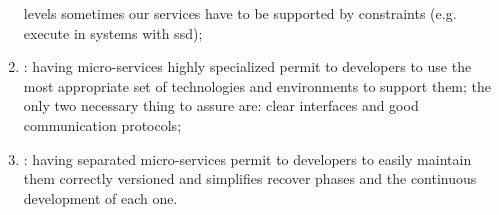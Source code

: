 \begin{enumerate}
{		levels sometimes our services have to be supported by constraints (e.g. execute in systems with
		\ac{ssd});}
	\item{: having micro-services highly specialized permit
		to developers to use the most appropriate set of technologies and environments to support them;
		the only two necessary thing to assure are: clear interfaces and good communication protocols;}
	\item{: having separated micro-services
		permit to developers to easily maintain them correctly versioned and simplifies recover phases
		and the continuous development of each one.}
\end{enumerate}